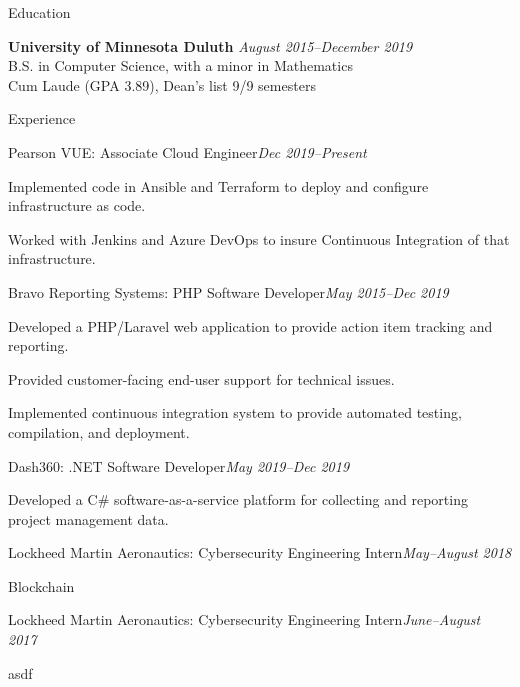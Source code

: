 \documentclass{resume} %
\begin{document}
\begin{rSection}{Education}

    {\bf University of Minnesota Duluth} \hfill {\em August 2015--December 2019} 
    \\ B.S. in Computer Science, with a minor in Mathematics
    \\ Cum Laude (GPA 3.89), Dean's list 9/9 semesters

\end{rSection}

\begin{rSection}{Experience}

    \begin{rSubsection}{Pearson VUE: \textnormal{Associate Cloud Engineer}}{\em Dec 2019--Present}{}{}
        \item Implemented code in Ansible and Terraform to deploy and configure infrastructure as code.
        \item Worked with Jenkins and Azure DevOps to insure Continuous Integration of that infrastructure.
    \end{rSubsection}

    \begin{rSubsection}{Bravo Reporting Systems: \textnormal{PHP Software Developer}}{\em May 2015--Dec 2019}{}{}
        \item Developed a PHP/Laravel web application to provide action item
            tracking and reporting.
        \item Provided customer-facing end-user support for technical issues.
        \item Implemented continuous integration system to provide automated testing,
            compilation, and deployment.
    \end{rSubsection}

    \begin{rSubsection}{Dash360: \textnormal{.NET Software Developer}}{\em May 2019--Dec 2019}{}{}
        \item Developed a C\# software-as-a-service platform for collecting and
            reporting project management data.
    \end{rSubsection}

    \begin{rSubsection}{Lockheed Martin Aeronautics: \textnormal{Cybersecurity Engineering Intern}}{\em May--August 2018}{}{}
        \item Blockchain
    \end{rSubsection}

    \begin{rSubsection}{Lockheed Martin Aeronautics: \textnormal{Cybersecurity Engineering Intern}}{\em June--August 2017}{}{}
        \item asdf
    \end{rSubsection}

\end{rSection}
\end{document}
